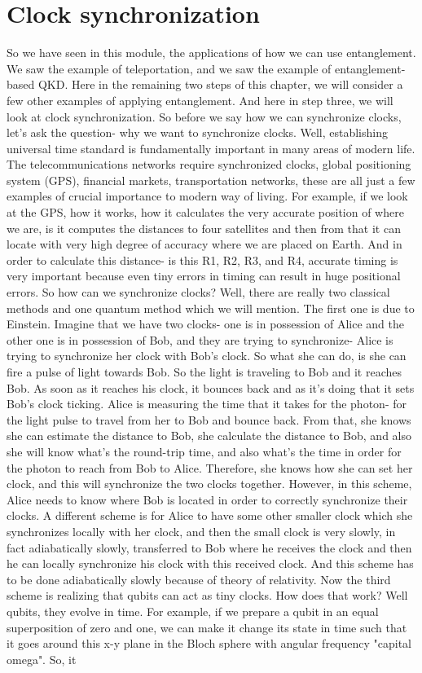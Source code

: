 \section{Clock synchronization}

So we have seen in this module, the applications of how we can use entanglement. We saw the example of teleportation, and we saw the example of entanglement-based QKD. Here in the remaining two steps of this chapter, we will consider a few other examples of applying entanglement. And here in step three, we will look at clock synchronization. So before we say how we can synchronize clocks, let's ask the question- why we want to synchronize clocks. Well, establishing universal time standard is fundamentally important in many areas of modern life. The telecommunications networks require synchronized clocks, global positioning system (GPS), financial markets, transportation networks, these are all just a few examples of crucial importance to modern way of living. For example, if we look at the GPS, how it works, how it calculates the very accurate position of where we are, is it computes the distances to four satellites and then from that it can locate with very high degree of accuracy where we are placed on Earth. And in order to calculate this distance- is this R1, R2, R3, and R4, accurate timing is very important because even tiny errors in timing can result in huge positional errors. So how can we synchronize clocks? Well, there are really two classical methods and one quantum method which we will mention. The first one is due to Einstein. Imagine that we have two clocks- one is in possession of Alice and the other one is in possession of Bob, and they are trying to synchronize- Alice is trying to synchronize her clock with Bob's clock. So what she can do, is she can fire a pulse of light towards Bob. So the light is traveling to Bob and it reaches Bob. As soon as it reaches his clock, it bounces back and as it's doing that it sets Bob's clock ticking. Alice is measuring the time that it takes for the photon- for the light pulse to travel from her to Bob and bounce back. From that, she knows she can estimate the distance to Bob, she calculate the distance to Bob, and also she will know what's the round-trip time, and also what's the time in order for the photon to reach from Bob to Alice. Therefore, she knows how she can set her clock, and this will synchronize the two clocks together. However, in this scheme, Alice needs to know where Bob is located in order to correctly synchronize their clocks. A different scheme is for Alice to have some other smaller clock which she synchronizes locally with her clock, and then the small clock is very slowly, in fact adiabatically slowly, transferred to Bob where he receives the clock and then he can locally synchronize his clock with this received clock. And this scheme has to be done adiabatically slowly because of theory of relativity. Now the third scheme is realizing that qubits can act as tiny clocks. How does that work? Well qubits, they evolve in time. For example, if we prepare a qubit in an equal superposition of zero and one, we can make it change its state in time such that it goes around this x-y plane in the Bloch sphere with angular frequency "capital omega". So, it 